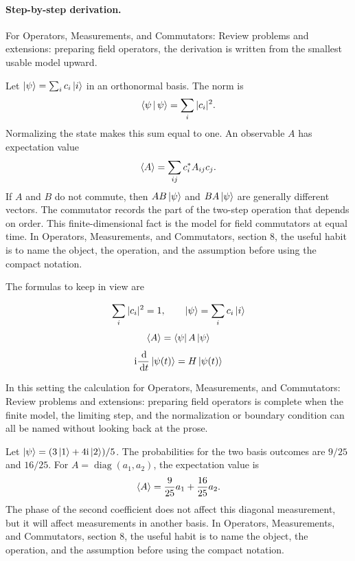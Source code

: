 \paragraph{Step-by-step derivation.}

For Operators, Measurements, and Commutators: Review problems and extensions: preparing field operators, the derivation is written from the smallest usable model upward.

Let \(\left|\psi\right\rangle=\sum_i c_i\left|i\right\rangle\) in an orthonormal basis.  The norm is
\[
  \left\langle \psi\,\middle|\,\psi\right\rangle=\sum_i |c_i|^2.
\]
Normalizing the state makes this sum equal to one.  An observable \(A\) has expectation value
\[
  \left\langle A\right\rangle=\sum_{ij}c_i^*A_{ij}c_j.
\]
If \(A\) and \(B\) do not commute, then \(AB\left|\psi\right\rangle\) and \(BA\left|\psi\right\rangle\) are generally different vectors.  The commutator records the part of the two-step operation that depends on order.  This finite-dimensional fact is the model for field commutators at equal time.  In Operators, Measurements, and Commutators, section 8, the useful habit is to name the object, the operation, and the assumption before using the compact notation.

The formulas to keep in view are

\[
  \sum_i |c_i|^2=1,\qquad \left|\psi\right\rangle=\sum_i c_i\left|i\right\rangle
\]
\[
  \left\langle A\right\rangle=\left\langle \psi\right|A\left|\psi\right\rangle
\]
\[
  \mathrm i\frac{\,\mathrm d}{\,\mathrm d t}\left|\psi(t)\right\rangle=H\left|\psi(t)\right\rangle
\]

In this setting the calculation for Operators, Measurements, and Commutators: Review problems and extensions: preparing field operators is complete when the finite model, the limiting step, and the normalization or boundary condition can all be named without looking back at the prose.




\begin{example}
Let \(\left|\psi\right\rangle=(3\left|1\right\rangle+4\mathrm i\left|2\right\rangle)/5\).  The probabilities for the two basis outcomes are \(9/25\) and \(16/25\).  For \(A=\operatorname{diag}(a_1,a_2)\), the expectation value is
\[
  \left\langle A\right\rangle=\frac{9}{25}a_1+\frac{16}{25}a_2.
\]
The phase of the second coefficient does not affect this diagonal measurement, but it will affect measurements in another basis.  In Operators, Measurements, and Commutators, section 8, the useful habit is to name the object, the operation, and the assumption before using the compact notation.
\end{example}



